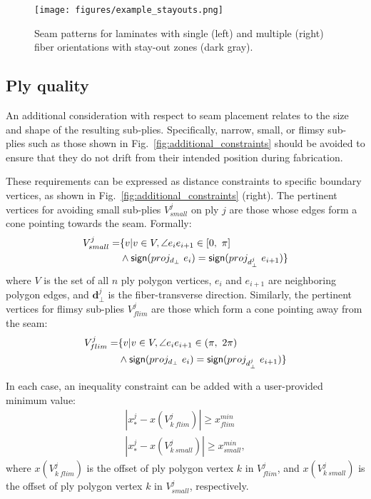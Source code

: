 \begin{figure}[h]
    \centering
    \texttt{[image: figures/example\_stayouts.png]}
    \caption{Seam patterns for laminates with single (left) and multiple (right) fiber orientations with stay-out zones (dark gray).}
    \label{fig:example_stayouts}
\end{figure}

\subsection{Ply quality}
An additional consideration with respect to seam placement relates to the size and shape of the resulting sub-plies. Specifically, narrow, small, or flimsy sub-plies such as those shown in Fig.~\ref{fig:additional_constraints} should be avoided to ensure that they do not drift from their intended position during fabrication.

These requirements can be expressed as distance constraints to specific boundary vertices, as shown in Fig.~\ref{fig:additional_constraints} (right). The pertinent vertices for avoiding small sub-plies $V_{small}^j$ on ply $j$ are those whose edges form a cone pointing towards the seam. Formally:
\begin{equation}
    \begin{split}
        V_{small}^j =  & \{{} v | v \in V, \angle e_{i} e_{i+1} \in [0, \ \pi]  \\
        & \wedge \mathsf{sign}(proj_{d_\perp} \ e_i) = \mathsf{sign}(proj_{d_\perp^j} \ e_{i+1}) \}
    \end{split}
\end{equation}
where $V$ is the set of all $n$ ply polygon vertices, $e_i$ and $e_{i+1}$ are neighboring polygon edges, and $\mathbf{d}_\perp^j$ is the fiber-transverse direction.
Similarly, the pertinent vertices for flimsy sub-plies $V_{flim}^j$ are those which form a cone pointing away from the seam:
\begin{equation}
    \begin{split}
        V_{flim}^j = & \{ v | v \in V, \angle e_{i} e_{i+1} \in (\pi, \ 2\pi) \\
        & \wedge \mathsf{sign}(proj_{d_\perp} \ e_i) = \mathsf{sign}(proj_{d_\perp^j} \ e_{i+1}) \} 
        \end{split}
\end{equation}

In each case, an inequality constraint can be added with a user-provided minimum value:
\begin{equation}
    \begin{split}
        |x_*^j - x(V_{k \ flim}^j)| \geq x_{flim}^{min} \\
        |x_*^j - x(V_{k \ small}^j)| \geq x_{small}^{min},
    \end{split}
\end{equation}
where $x(V_{k \ flim}^j)$ is the offset of ply polygon vertex $k$ in $V_{flim}^j$, and $x(V_{k \ small}^j)$ is the offset of ply polygon vertex $k$ in $V_{small}^j$, respectively.

